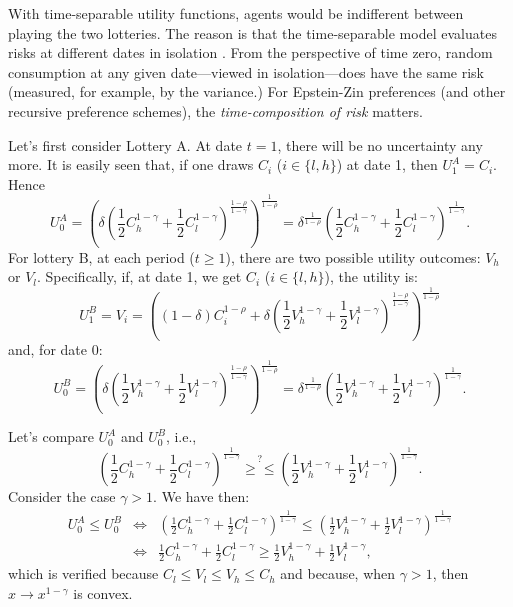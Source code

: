 \documentclass[
  12pt,
]{book}
\theoremstyle{definition}
\theoremstyle{definition}
\theoremstyle{definition}
\theoremstyle{definition}
\theoremstyle{remark}
\begin{document}
With time-separable utility functions, agents would be indifferent between playing the two lotteries. The reason is that the time-separable model evaluates risks at different dates in isolation \citep{Piazzesi_Schneider_2007}. From the perspective of time zero, random consumption at any given date---viewed in isolation---does have the same risk (measured, for example, by the variance.) For Epstein-Zin preferences (and other recursive preference schemes), the \emph{time-composition of risk} matters.

Let's first consider Lottery A. At date \(t=1\), there will be no uncertainty any more. It is easily seen that, if one draws \(C_i\) (\(i \in \{l,h\}\)) at date 1, then \(U_1^A = C_i\). Hence
\begin{equation}
U_0^A =  \left(\delta \left(\frac{1}{2}C_h^{1-\gamma}+\frac{1}{2}C_l^{1-\gamma}\right)^{\frac{1-\rho}{1-\gamma}}\right)^{\frac{1}{1-\rho}}= \delta^{\frac{1}{1-\rho}} \left(\frac{1}{2}C_h^{1-\gamma}+\frac{1}{2}C_l^{1-\gamma}\right)^{\frac{1}{1-\gamma}}.\label{eq:U0A}
\end{equation}
For lottery B, at each period (\(t\ge1\)), there are two possible utility outcomes: \(V_h\) or \(V_l\).
Specifically, if, at date 1, we get \(C_i\) (\(i \in \{l,h\}\)), the utility is:
\begin{equation}
U_1^B = V_i = \left((1-\delta)C_i^{1-\rho} + \delta \left(\frac{1}{2}V_h^{1-\gamma}+\frac{1}{2}V_l^{1-\gamma}\right)^{\frac{1-\rho}{1-\gamma}}\right)^{\frac{1}{1-\rho}}\label{eq:ABCD}
\end{equation}
and, for date 0:
\[
U_0^B =  \left(\delta \left(\frac{1}{2}V_h^{1-\gamma}+\frac{1}{2}V_l^{1-\gamma}\right)^{\frac{1-\rho}{1-\gamma}}\right)^{\frac{1}{1-\rho}}= \delta^{\frac{1}{1-\rho}}\left(\frac{1}{2}V_h^{1-\gamma}+\frac{1}{2}V_l^{1-\gamma}\right)^{\frac{1}{1-\gamma}}.
\]

Let's compare \(U_0^A\) and \(U_0^B\), i.e.,
\[
\left(\frac{1}{2}C_h^{1-\gamma}+\frac{1}{2}C_l^{1-\gamma}\right)^{\frac{1}{1-\gamma}}
\overset{?}{\ge \le}
\left(\frac{1}{2}V_h^{1-\gamma}+\frac{1}{2}V_l^{1-\gamma}\right)^{\frac{1}{1-\gamma}}.
\]
Consider the case \(\gamma > 1\). We have then:
\begin{eqnarray*}
U_0^A \le U_0^B &\Leftrightarrow& \left(\frac{1}{2}C_h^{1-\gamma}+\frac{1}{2}C_l^{1-\gamma}\right)^{\frac{1}{1-\gamma}} \le \left(\frac{1}{2}V_h^{1-\gamma}+\frac{1}{2}V_l^{1-\gamma}\right)^{\frac{1}{1-\gamma}}\\
&\Leftrightarrow& \frac{1}{2}C_h^{1-\gamma}+\frac{1}{2}C_l^{1-\gamma} \ge \frac{1}{2}V_h^{1-\gamma}+\frac{1}{2}V_l^{1-\gamma},
\end{eqnarray*}
which is verified because \(C_l \le V_l \le V_h \le C_h\) and because, when \(\gamma > 1\), then \(x\rightarrow x^{1-\gamma}\) is convex.
\end{document}
